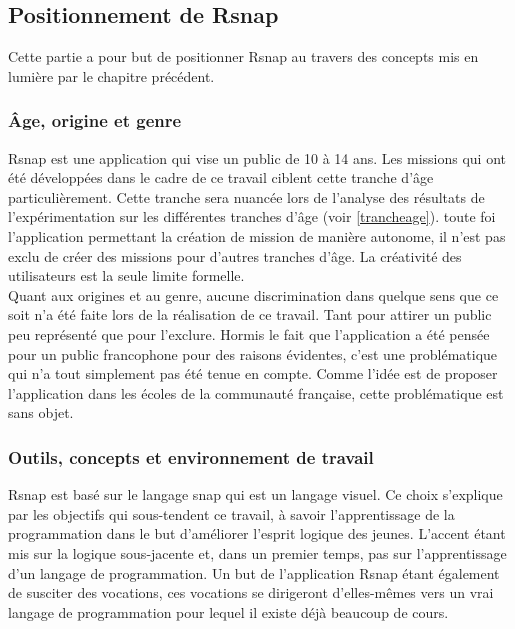 ﻿\subsection{Positionnement de \gls{Rsnap}}
Cette partie a pour but de positionner \gls{Rsnap} au travers des concepts mis en lumière par le chapitre précédent.

\subsubsection{Âge, origine et genre}
\gls{Rsnap} est une application qui vise un public de 10 à 14 ans. Les missions qui ont été développées dans le cadre de ce travail ciblent cette tranche d'âge particulièrement. Cette tranche sera nuancée lors de l'analyse des résultats de l'expérimentation sur les différentes tranches d'âge (voir \ref{trancheage}). %
toute foi l'application permettant la création de mission de manière autonome, il n'est pas exclu de créer des missions pour d'autres tranches d'âge. La créativité des utilisateurs est la seule limite formelle.\\

Quant aux origines et au genre, aucune discrimination dans quelque sens que ce soit n'a été faite lors de la réalisation de ce travail. Tant pour attirer un public peu représenté que pour l'exclure. Hormis le fait que l'application a été pensée pour un public francophone pour des raisons évidentes, c'est une problématique qui n'a tout simplement pas été tenue en compte. Comme l'idée est de proposer l'application dans les écoles de la communauté française, cette problématique est sans objet.

\subsubsection{Outils, concepts et environnement de travail}
\gls{Rsnap} est basé sur le langage \gls{snap} qui est un langage visuel. Ce choix s'explique par les objectifs qui sous-tendent ce travail, à savoir l'apprentissage de la programmation dans le but d'améliorer l'esprit logique des jeunes. L'accent étant mis sur la logique sous-jacente et, dans un premier temps, pas sur l'apprentissage d'un langage de programmation. Un but de l'application \gls{Rsnap} étant également de susciter des vocations, ces vocations se dirigeront d'elles-mêmes vers un vrai langage de programmation pour lequel il existe déjà beaucoup de cours.

